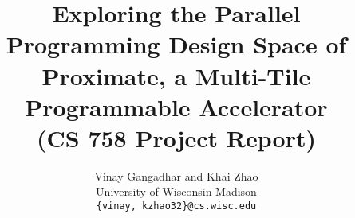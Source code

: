 \documentclass[10pt]{article}
\title{{Exploring the Parallel Programming Design Space of \\
        Proximate, a Multi-Tile Programmable Accelerator}\\ 
        { \normalsize (CS 758 Project Report)}}
\author{Vinay Gangadhar and Khai Zhao \\University of Wisconsin-Madison\\{\tt \{vinay, kzhao32\}@cs.wisc.edu}}
\date{}
\begin{document}
\maketitle

\doublespacing









%

%

\singlespace


\end{document}
